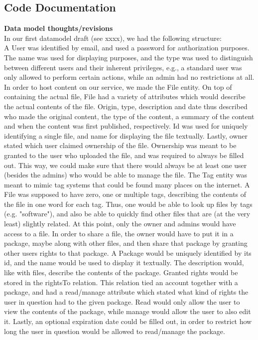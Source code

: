 \documentclass[10pt,a4paper]{article}
\begin{document}
\subsection{Code Documentation}
{\bfseries Data model thoughts/revisions}\\
In our first datamodel draft (see xxxx), we had the following structure:\\
A User was identified by email, and used a password for authorization purposes. The name was used for displaying purposes, and the type was used to distinguish between different users and their inherent privileges, e.g., a standard user was only allowed to perform certain actions, while an admin had no restrictions at all. In order to host content on our service, we made the File entity. On top of containing the actual file, File had a variety of attributes which would describe the actual contents of the file. Origin, type, description and date thus described who made the original content, the type of the content, a summary of the content and when the content was first published, respectively. Id was used for uniquely identifying a single file, and name for displaying the file textually. Lastly, owner stated which user claimed ownership of the file. Ownership was meant to be granted to the user who uploaded the file, and was required to always be filled out. This way, we could make sure that there would always be at least one user (besides the admins) who would be able to manage the file. The Tag entity was meant to mimic tag systems that could be found many places on the internet. A File was supposed to have zero, one or multiple tags, describing the contents of the file in one word for each tag. Thus, one would be able to look up files by tags (e.g. "software"), and also be able to quickly find other files that are (at the very least) slightly related. At this point, only the owner and admins would have access to a file. In order to share a file, the owner would have to put it in a package, maybe along with other files, and then share that package by granting other users rights to that package. A Package would be uniquely identified by its id, and the name would be used to display it textually. The description would, like with files, describe the contents of the package. Granted rights would be stored in the rightsTo relation. This relation tied an account together with a package, and had a read/manage attribute which stated what kind of rights the user in question had to the given package. Read would only allow the user to view the contents of the package, while manage would allow the user to also edit it. Lastly, an optional expiration date could be filled out, in order to restrict how long the user in question would be allowed to read/manage the package.\\
\end{document}
